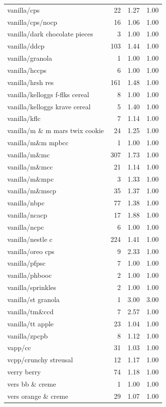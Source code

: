 \begin{table}
\begin{tabular}{lrrr}
vanilla/cps & 22 & 1.27 & 1.00 \\
vanilla/cps/nocp & 16 & 1.06 & 1.00 \\
vanilla/dark chocolate pieces & 3 & 1.00 & 1.00 \\
vanilla/ddcp & 103 & 1.44 & 1.00 \\
vanilla/granola & 1 & 1.00 & 1.00 \\
vanilla/hccps & 6 & 1.00 & 1.00 \\
vanilla/hrsh res & 161 & 1.48 & 1.00 \\
vanilla/kelloggs f-flks cereal & 8 & 1.00 & 1.00 \\
vanilla/kelloggs krave cereal & 5 & 1.40 & 1.00 \\
vanilla/kflc & 7 & 1.14 & 1.00 \\
vanilla/m \& m mars twix cookie & 24 & 1.25 & 1.00 \\
vanilla/m\&m mpbcc & 1 & 1.00 & 1.00 \\
vanilla/m\&mc & 307 & 1.73 & 1.00 \\
vanilla/m\&mcc & 21 & 1.14 & 1.00 \\
vanilla/m\&mpc & 3 & 1.33 & 1.00 \\
vanilla/m\&mscp & 35 & 1.37 & 1.00 \\
vanilla/nbpc & 77 & 1.38 & 1.00 \\
vanilla/ncacp & 17 & 1.88 & 1.00 \\
vanilla/ncpc & 6 & 1.00 & 1.00 \\
vanilla/nestle c & 224 & 1.41 & 1.00 \\
vanilla/oreo cps & 9 & 2.33 & 1.00 \\
vanilla/pfpsc & 7 & 1.00 & 1.00 \\
vanilla/phbooc & 2 & 1.00 & 1.00 \\
vanilla/sprinkles & 2 & 1.00 & 1.00 \\
vanilla/st granola & 1 & 3.00 & 3.00 \\
vanilla/tm\&ccd & 7 & 2.57 & 1.00 \\
vanilla/tt apple & 23 & 1.04 & 1.00 \\
vanilla/zpcpb & 8 & 1.12 & 1.00 \\
vapp/cc & 31 & 1.03 & 1.00 \\
vcpp/crunchy streusal & 12 & 1.17 & 1.00 \\
verry berry & 74 & 1.18 & 1.00 \\
vers bb \& creme & 1 & 1.00 & 1.00 \\
vers orange \& creme & 29 & 1.07 & 1.00 \\

\end{tabular}
\end{table}
